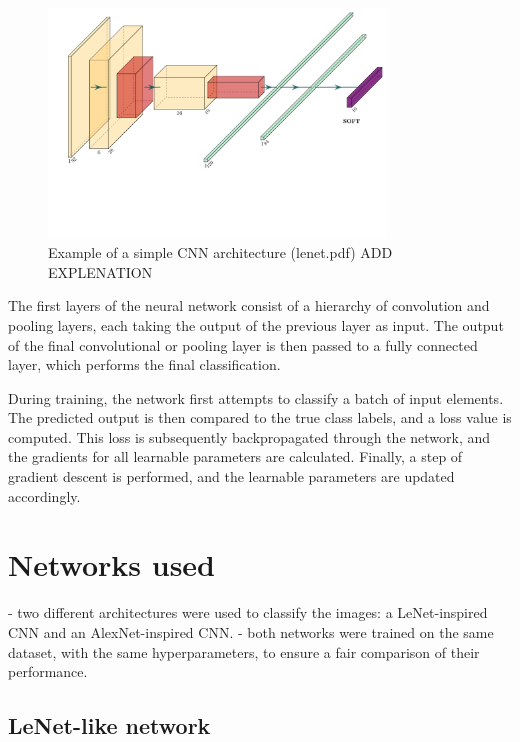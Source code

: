 \documentclass{pracalicmgr}
\begin{document}
\begin{figure}[H]
    \centering
    \includegraphics[width=0.8\textwidth]{src/lenet.pdf}
    \caption{Example of a simple CNN architecture (lenet.pdf) {ADD EXPLENATION}\cite{exCNN}}
\end{figure}


The first layers of the neural network consist of a hierarchy of convolution and pooling layers, each taking the output of the previous layer as input. The output of the final convolutional or pooling layer is then passed to a fully connected layer, which performs the final classification.

During training, the network first attempts to classify a batch of input elements. The predicted output is then compared to the true class labels, and a loss value is computed. This loss is subsequently backpropagated through the network, and the gradients for all learnable parameters are calculated. Finally, a step of gradient descent is performed, and the learnable parameters are updated accordingly.


\section{Networks used}

- two different architectures were used to classify the images: a LeNet-inspired CNN and an AlexNet-inspired CNN.
- both networks were trained on the same dataset, with the same hyperparameters, to ensure a fair comparison of their performance.


\subsection{LeNet-like network}
\end{document}
